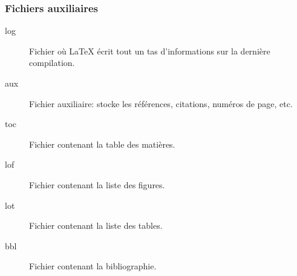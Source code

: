 \documentclass{beamer}
\begin{document}
\begin{frame}
	\frametitle{Fichiers auxiliaires}
	\begin{description}
	\item[log] Fichier où \LaTeX{} écrit tout un tas d'informations sur la dernière compilation.
	\item[aux] Fichier auxiliaire: stocke les références, citations, numéros de page, etc.
	\item[toc] Fichier contenant la table des matières.
	\item[lof] Fichier contenant la liste des figures.
	\item[lot] Fichier contenant la liste des tables.
	\item[bbl] Fichier contenant la bibliographie.
	\end{description}
\end{frame}
\end{document}

